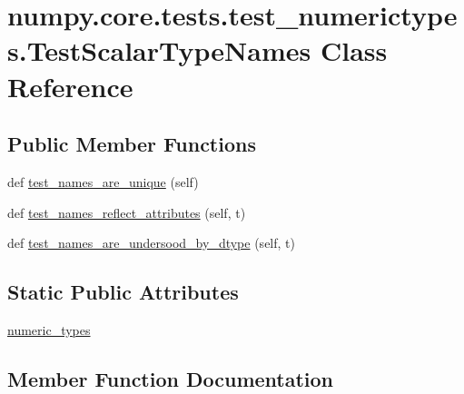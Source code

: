\hypertarget{classnumpy_1_1core_1_1tests_1_1test__numerictypes_1_1TestScalarTypeNames}{}\section{numpy.\+core.\+tests.\+test\+\_\+numerictypes.\+Test\+Scalar\+Type\+Names Class Reference}
\label{classnumpy_1_1core_1_1tests_1_1test__numerictypes_1_1TestScalarTypeNames}
\subsection*{Public Member Functions}
\begin{DoxyCompactItemize}
\item 
def \hyperlink{classnumpy_1_1core_1_1tests_1_1test__numerictypes_1_1TestScalarTypeNames_a0485f71e8e0fafe13b886a7b6c4cd60d}{test\+\_\+names\+\_\+are\+\_\+unique} (self)
\item 
def \hyperlink{classnumpy_1_1core_1_1tests_1_1test__numerictypes_1_1TestScalarTypeNames_a94a8f4535dff3d46fa3fdfc001730135}{test\+\_\+names\+\_\+reflect\+\_\+attributes} (self, t)
\item 
def \hyperlink{classnumpy_1_1core_1_1tests_1_1test__numerictypes_1_1TestScalarTypeNames_a04492de6a397d90a6bed6d68d435329b}{test\+\_\+names\+\_\+are\+\_\+undersood\+\_\+by\+\_\+dtype} (self, t)
\end{DoxyCompactItemize}
\subsection*{Static Public Attributes}
\begin{DoxyCompactItemize}
\item 
\hyperlink{classnumpy_1_1core_1_1tests_1_1test__numerictypes_1_1TestScalarTypeNames_a41280593def27be3fc75a25884a29f4a}{numeric\+\_\+types}
\end{DoxyCompactItemize}


\subsection{Member Function Documentation}
\mbox{\label{classnumpy_1_1core_1_1tests_1_1test__numerictypes_1_1TestScalarTypeNames_a04492de6a397d90a6bed6d68d435329b}} 
